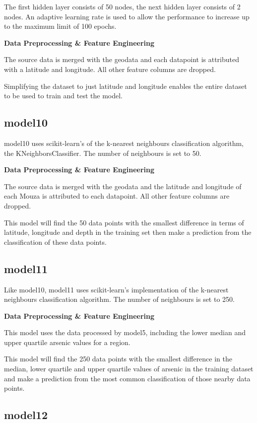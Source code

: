 The first hidden layer consists of 50 nodes, the next hidden layer consists of 2 nodes. An adaptive learning rate is used to allow the performance to increase up to the maximum limit of 100 epochs.

\textbf{Data Preprocessing \& Feature Engineering}

The source data is merged with the geodata and each datapoint is attributed with a latitude and longitude. All other feature columns are dropped.

Simplifying the dataset to just latitude and longitude enables the entire dataset to be used to train and test the model.

\subsection{model10}

model10 uses scikit-learn's of the k-nearest neighbours classification algorithm, the KNeighborsClassifier. The number of neighbours is set to 50.

\textbf{Data Preprocessing \& Feature Engineering}

The source data is merged with the geodata and the latitude and longitude of each Mouza is attributed to each datapoint. All other feature columns are dropped.

This model will find the 50 data points with the smallest difference in terms of latitude, longitude and depth in the training set then make a prediction from the classification of these data points.

\subsection{model11}

Like model10, model11 uses scikit-learn's implementation of the k-nearest neighbours classification algorithm. The number of neighbours is set to 250.

\textbf{Data Preprocessing \& Feature Engineering}

This model uses the data processed by model5, including the lower median and upper quartile arsenic values for a region.

This model will find the 250 data points with the smallest difference in the median, lower quartile and upper quartile values of arsenic in the training dataset and make a prediction from the most common classification of those nearby data points.

\subsection{model12}

